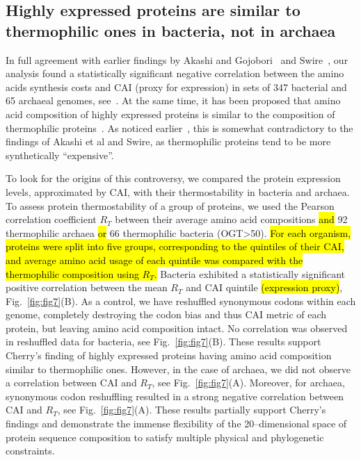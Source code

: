 \documentclass[10pt,letterpaper]{article}
\begin{document}
\subsection*{Highly expressed proteins are similar to thermophilic ones in bacteria, not in archaea}

In full agreement with earlier findings by Akashi and Gojobori~\cite{Akashi2002Metabolic} and Swire~\cite{Swire2007Selection}, our analysis found a statistically significant negative correlation between the amino acids synthesis costs and CAI (proxy for expression) in sets of 347 bacterial and 65 archaeal genomes, see~. At the same time, it has been proposed that amino acid composition of highly expressed proteins is similar to the composition of thermophilic proteins~\cite{Cherry2010Highly}. As noticed earlier~\cite{Serohijos2012Protein}, this is somewhat contradictory to the findings of Akashi et al and Swire, as thermophilic proteins tend to be more synthetically ``expensive''.

To look for the origins of this controversy, we compared the protein expression levels, approximated by CAI, with their thermostability in bacteria and archaea. To assess protein thermostability of a group of proteins, we used the Pearson correlation coefficient $R_T$ between their average amino acid compositions \hl{and} 92 thermophilic archaea \hl{or} 66 thermophilic bacteria (OGT\textgreater50\textcelsius). \hl{For each organism, proteins were split into five groups, corresponding to the quintiles of their CAI, and average amino acid usage of each quintile was compared with the thermophilic composition using $R_T$.} Bacteria exhibited a statistically significant positive correlation between the mean $R_T$ and CAI quintile \hl{(expression proxy)}, Fig.~\ref{fig:fig7}(B). As a control, we have reshuffled synonymous codons within each genome, completely destroying the codon bias and thus CAI metric of each protein, but leaving amino acid composition intact. No correlation was observed in reshuffled data for bacteria, see Fig.~\ref{fig:fig7}(B). These results support Cherry's finding of highly expressed proteins having amino acid composition similar to thermophilic ones. However, in the case of archaea, we did not observe a correlation between CAI and $R_T$, see Fig.~\ref{fig:fig7}(A). Moreover, for archaea, synonymous codon reshuffling resulted in a strong negative correlation between CAI and $R_T$, see Fig.~\ref{fig:fig7}(A). These results partially support Cherry's findings and demonstrate the immense flexibility of the 20--dimensional space of protein sequence composition to satisfy multiple physical and phylogenetic constraints.
\end{document}
